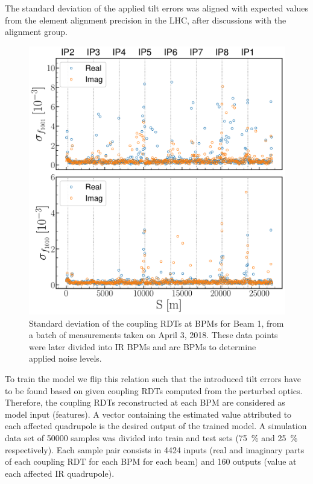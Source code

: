 The standard deviation of the applied tilt errors was aligned with expected values from the element alignment precision in the LHC, after discussions with the alignment group. 

\begin{figure}[!htb]
    \centering
    \includegraphics*[width=0.9\columnwidth]{Figures/ML_for_IR_Coupling/rdts_stdev_batch.pdf}
    \caption{Standard deviation of the coupling RDTs at BPMs for Beam 1, from a batch of measurements taken on April 3, 2018. These data points were later divided into IR BPMs and arc BPMs to determine applied noise levels.}
    \label{fig:rdts_stdev_batch}
\end{figure}

To train the model we flip this relation such that the introduced tilt errors have to be found based on given coupling RDTs computed from the perturbed optics.
Therefore, the coupling RDTs reconstructed at each BPM are considered as model input (features).
A vector containing the estimated \DPSI value attributed to each affected quadrupole is the desired output of the trained model.
A simulation data set of \num{50000} samples was divided into train and test sets (\qty{75}{\percent} and \qty{25}{\percent} respectively).
Each sample pair consists in \num{4424} inputs (real and imaginary parts of each coupling RDT for each BPM for each beam) and \num{160} outputs (\DPSI value at each affected IR quadrupole).

